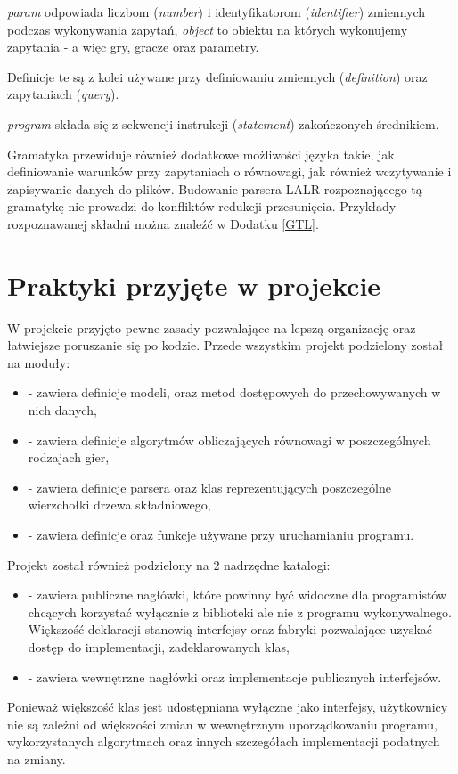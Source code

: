 \documentclass[polish]{standalone}
\begin{document}
\textit{param} odpowiada liczbom (\textit{number}) i identyfikatorom (\textit{identifier}) zmiennych podczas wykonywania
zapytań, \textit{object} to obiektu na których wykonujemy zapytania - a więc gry, gracze oraz parametry.

Definicje te są z kolei używane przy definiowaniu zmiennych (\textit{definition}) oraz zapytaniach (\textit{query}).

\textit{program} składa się z sekwencji instrukcji (\textit{statement}) zakończonych średnikiem.

Gramatyka przewiduje również dodatkowe możliwości języka takie, jak definiowanie warunków przy zapytaniach o równowagi,
jak również wczytywanie i zapisywanie danych do plików. Budowanie parsera LALR rozpoznającego tą gramatykę nie prowadzi
do konfliktów redukcji-przesunięcia. Przykłady rozpoznawanej składni można znaleźć w Dodatku \ref{GTL}.

\section{Praktyki przyjęte w projekcie}

W projekcie przyjęto pewne zasady pozwalające na lepszą organizację oraz łatwiejsze poruszanie się po kodzie. Przede
wszystkim projekt podzielony został na moduły:
\begin{itemize}
\item {} - zawiera definicje modeli, oraz metod dostępowych do przechowywanych w nich danych,
\item {} - zawiera definicje algorytmów obliczających równowagi w poszczególnych rodzajach gier,
\item {} - zawiera definicje parsera oraz klas reprezentujących poszczególne wierzchołki drzewa składniowego,
\item {} - zawiera definicje oraz funkcje używane przy uruchamianiu programu.
\end{itemize}

Projekt został również podzielony na 2 nadrzędne katalogi:
\begin{itemize}
\item {} - zawiera publiczne nagłówki, które powinny być widoczne dla programistów chcących korzystać
wyłącznie z biblioteki ale nie z programu wykonywalnego. Większość deklaracji stanowią interfejsy oraz fabryki
pozwalające uzyskać dostęp do implementacji, zadeklarowanych klas,
\item {} - zawiera wewnętrzne nagłówki oraz implementacje publicznych interfejsów.
\end{itemize}
Ponieważ większość klas jest udostępniana wyłączne jako interfejsy, użytkownicy nie są zależni od większości zmian
w wewnętrznym uporządkowaniu programu, wykorzystanych algorytmach oraz innych szczegółach implementacji podatnych
na zmiany.
\end{document}

